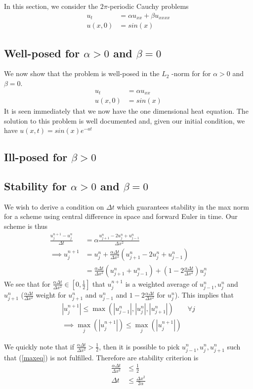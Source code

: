 In this section, we consider the $2\pi$-periodic Cauchy problems
\begin{align*}
u_t &= \alpha u_{xx} + \beta u_{xxxx} \\
u(x,0) &= sin(x)
\end{align*}


\subsection{Well-posed for $\alpha>0$ and $\beta = 0$}
We now show that the problem is well-posed in the $L_2$ -norm for for $\alpha>0$ and $\beta = 0$.
\begin{align*}
u_t &= \alpha u_{xx} \\
u(x,0) &= sin(x)
\end{align*} 
It is seen immediately that we now have the one dimensional heat equation. The solution to this problem is well documented and, given our initial condition, we have $u(x,t) = sin(x)e^{-at}$  



\subsection{Ill-posed for $\beta>0$}


\subsection{Stability for $\alpha>0$ and $\beta=0$}
We wish to derive a condition on $\Delta t$ which guarantees stability in the max norm for a scheme using central difference in space and forward Euler in time. Our scheme is thus
\begin{align*}
\frac{u_j^{n+1} - u_j^n}{\Delta t}&=\alpha \frac{u_{j+1}^n -2u_j^n+u_{j-1}^n}{\Delta x^2} \\
\implies u_j^{n+1} &= u_j^n + \frac{\alpha \Delta t}{\Delta x^2} (u_{j+1}^n -2u_j^n+u_{j-1}^n) \\
&=  \frac{\alpha \Delta t}{\Delta x^2} (u_{j+1}^n +u_{j-1}^n) + (1-2\frac{\alpha \Delta t}{\Delta x^2})u_j^n 
\end{align*}
We see that for $\frac{\alpha \Delta t}{\Delta x^2} \in [0,\frac{1}{2}]$ that $u_j^{n+1}$ is a weighted average of $u_{j-1}^n,u_j^n$ and $u_{j+1}^n$ ($\frac{\alpha \Delta t}{\Delta x^2}$ weight for $u_{j+1}^n$ and $u_{j-1}^n$ and $1-2\frac{\alpha \Delta t}{\Delta x^2}$ for $u_j^n$).
This implies that
\begin{align}
|u_j^{n+1}| \leq \max(|u_{j-1}^n|,|u_j^n|,|u_{j+1}^n|) \qquad \forall j \label{maxeq} \\
\implies \max_j (|u_j^{n+1}|) \leq \max_j (|u_j^{n+1}|) \nonumber
\end{align}

We quickly note that if $\frac{\alpha \Delta t}{\Delta x^2}>\frac{1}{2}$, then it is possible to pick $u_{j-1}^n,u_j^n,u_{j+1}^n$ such that (\ref{maxeq}) is not fulfilled. Therefore are stability criterion is 
\begin{align*}
\frac{\alpha \Delta t}{\Delta x^2} &\leq \frac{1}{2} \\
\Delta t &\leq \frac{\Delta x^2}{2\alpha}
\end{align*}
